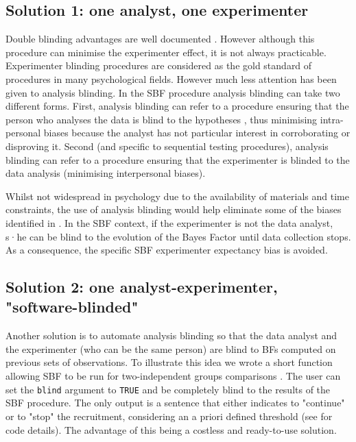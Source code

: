 \documentclass[a4paper,man,natbib,floatsintext,donotrepeattitle]{apa6}
\begin{document}
\subsection{Solution 1: one analyst, one experimenter}

Double blinding advantages are well documented \citep{schulz_blinding_2002}. However although this procedure can minimise the experimenter effect, it is not always practicable. Experimenter blinding procedures are considered as the gold standard of procedures in many psychological fields. However much less attention has been given to analysis blinding. In the SBF procedure analysis blinding can take two different forms. First, analysis blinding can refer to a procedure ensuring that the person who analyses the data is blind to the hypotheses \citep{miller_blind_2011}, thus minimising intra-personal biases because the analyst has not particular interest in corroborating or disproving it. Second (and specific to sequential testing procedures), analysis blinding can refer to a procedure ensuring that the experimenter is blinded to the data analysis (minimising interpersonal biases).

Whilst not widespread in psychology due to the availability of materials and time constraints, the use of analysis blinding would help eliminate some of the biases identified in \cite{wicherts_degrees_2016}. In the SBF context, if the experimenter is not the data analyst, s·he can be blind to the evolution of the Bayes Factor until data collection stops. As a consequence, the specific SBF experimenter expectancy bias is avoided.

\subsection{Solution 2: one analyst-experimenter, "software-blinded"}

Another solution is to automate analysis blinding so that the data analyst and the experimenter (who can be the same person) are blind to BFs computed on previous sets of observations. To illustrate this idea we wrote a short function allowing SBF to be run for two-independent groups comparisons \citep[as in][]{schonbrodt_sequential_2017}. The user can set the \texttt{blind} argument to \texttt{TRUE} and be completely blind to the results of the SBF procedure. The only output is a sentence that either indicates to "continue" or to "stop" the recruitment, considering an a priori defined threshold (see  for code details). The advantage of this being a costless and ready-to-use solution.
\end{document}

